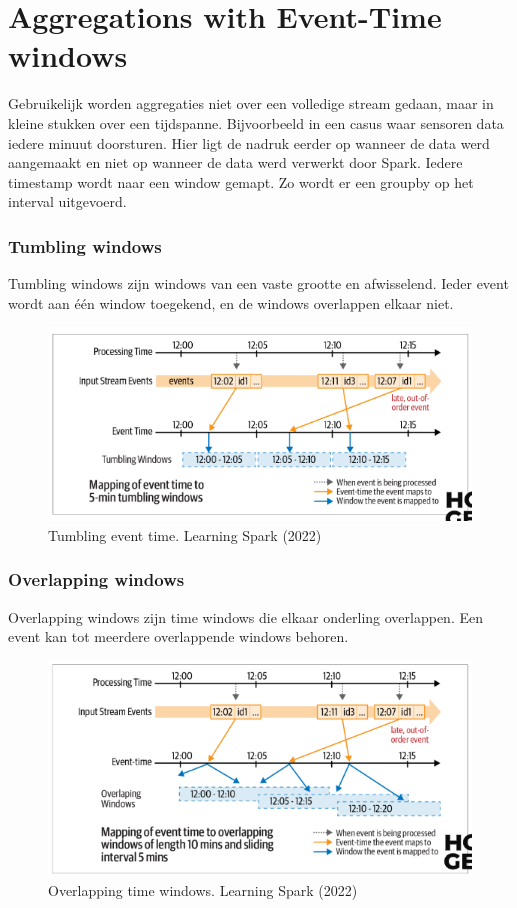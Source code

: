 \documentclass[a4paper,10pt,twoside]{report}
\begin{document}
\section{Aggregations with Event-Time windows}

Gebruikelijk worden aggregaties niet over een volledige stream gedaan, maar in kleine stukken over een tijdspanne. Bijvoorbeeld in een casus waar sensoren data iedere minuut doorsturen. Hier ligt de nadruk eerder op wanneer de data werd aangemaakt en niet op wanneer de data werd verwerkt door Spark. Iedere timestamp wordt naar een window gemapt. Zo wordt er een groupby op het interval uitgevoerd.

\subsubsection{Tumbling windows}

Tumbling windows zijn windows van een vaste grootte en afwisselend. Ieder event wordt aan één window toegekend, en de windows overlappen elkaar niet. 

\begin{figure}
	\includegraphics[width=\linewidth]{images/tumbling.png}
	\caption{Tumbling event time. Learning Spark (2022)}
\end{figure}

\subsubsection{Overlapping windows}

Overlapping windows zijn time windows die elkaar onderling overlappen. Een event kan tot meerdere overlappende windows behoren.

\begin{figure}
	\includegraphics[width=\linewidth]{images/overlapping.png}
	\caption{Overlapping time windows. Learning Spark (2022)}
\end{figure}
\end{document}
